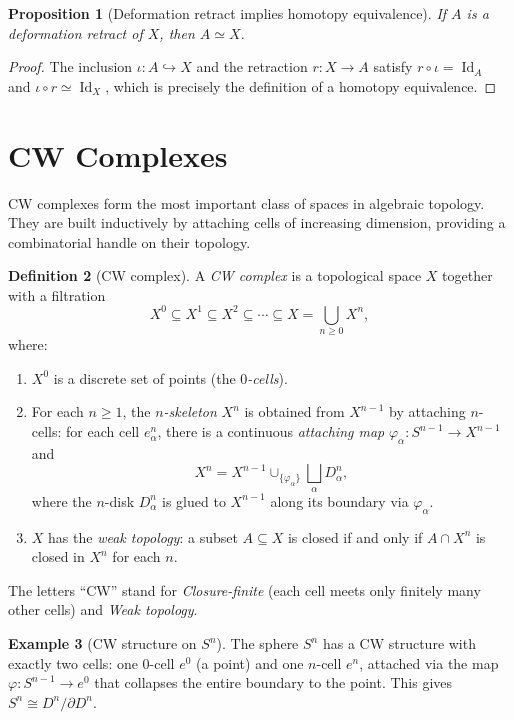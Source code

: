 \documentclass[12pt,a4paper,openany]{book}
\theoremstyle{definition}
\newtheorem{definition}{Definition}[chapter]
\newtheorem{example}[definition]{Example}
\theoremstyle{plain}
\newtheorem{proposition}[definition]{Proposition}
\theoremstyle{remark}
\DeclareMathOperator{\Id}{Id}
\begin{document}
\begin{proposition}[Deformation retract implies homotopy equivalence]\label{prop:def-retract-htpy-equiv}
If $A$ is a deformation retract of $X$, then $A \simeq X$.
\end{proposition}

\begin{proof}
The inclusion $\iota \colon A \hookrightarrow X$ and the retraction $r \colon X
\to A$ satisfy $r \circ \iota = \Id_A$ and $\iota \circ r \simeq \Id_X$, which
is precisely the definition of a homotopy equivalence.
\end{proof}


\section{CW Complexes}\label{sec:CW-complexes}

CW complexes form the most important class of spaces in algebraic topology. They
are built inductively by attaching cells of increasing dimension, providing a
combinatorial handle on their topology.

\begin{definition}[CW complex]\label{def:CW-complex}
A \emph{CW complex} is a topological space $X$ together with
a filtration
\[
  X^0 \subseteq X^1 \subseteq X^2 \subseteq \cdots \subseteq X = \bigcup_{n \ge 0} X^n,
\]
where:
\begin{enumerate}[label=(\roman*)]
\item $X^0$ is a discrete set of points (the \emph{$0$-cells}).
\item For each $n \ge 1$, the \emph{$n$-skeleton} $X^n$ is obtained from
  $X^{n-1}$ by attaching $n$-cells: for each cell $e^n_\alpha$, there is a
  continuous \emph{attaching map} $\varphi_\alpha \colon S^{n-1} \to X^{n-1}$
  and
  \[
    X^n = X^{n-1} \cup_{\{\varphi_\alpha\}} \bigsqcup_\alpha D^n_\alpha,
  \]
  where the $n$-disk $D^n_\alpha$ is glued to $X^{n-1}$ along its boundary via
  $\varphi_\alpha$.
\item $X$ has the \emph{weak topology}: a subset $A \subseteq X$ is closed if
  and only if $A \cap X^n$ is closed in $X^n$ for each $n$.
\end{enumerate}
The letters ``CW'' stand for \emph{Closure-finite} (each cell meets only
finitely many other cells) and \emph{Weak topology}.
\end{definition}

\begin{example}[CW structure on $S^n$]\label{ex:CW-sphere}
The sphere $S^n$ has a CW structure with exactly two cells: one $0$-cell $e^0$
(a point) and one $n$-cell $e^n$, attached via the map $\varphi \colon S^{n-1}
\to e^0$ that collapses the entire boundary to the point. This gives $S^n \cong
D^n / \partial D^n$.
\end{example}
\end{document}
